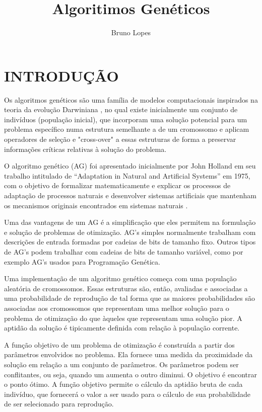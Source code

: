 \documentclass[conference]{IEEEtran}
\begin{document}
\title{Algoritimos Genéticos}

\author{Bruno Lopes}
\maketitle

\section{INTRODUÇÃO}
Os algoritmos genéticos \cite{b1} são uma família de modelos computacionais inspirados na teoria da evolução Darwiniana \cite{b2}, no qual existe inicialmente um conjunto de indivíduos (população inicial), que incorporam uma solução potencial para um problema específico numa estrutura semelhante a de um cromossomo e aplicam operadores de seleção e "cross-over" a essas estruturas de forma a preservar informações críticas relativas à solução do problema.
    
O algoritmo genético (AG) foi apresentado inicialmente por John Holland em seu trabalho intitulado de “Adaptation in Natural and Artificial Systems” em 1975, com o objetivo de  formalizar  matematicamente  e  explicar  os  processos  de  adaptação  de  processos  naturais e  desenvolver  sistemas  artificiais  que  mantenham  os  mecanismos  originais  encontrados  em sistemas naturais \cite{b3}. 

Uma das vantagens de um AG é a simplificação que eles permitem na formulação e solução de  problemas de otimização. AG's simples normalmente trabalham com descrições de entrada formadas por cadeias de bits de tamanho fixo. Outros tipos de AG's podem trabalhar com cadeias de bits de tamanho variável, como por exemplo AG's usados para Programação Genética. 

Uma implementação de um algoritmo genético começa com uma população aleatória de cromossomos. Essas estruturas são, então, avaliadas e associadas a uma probabilidade de reprodução de tal forma que as maiores probabilidades são associadas aos  cromossomos que representam uma melhor solução para o problema de otimização do que àqueles que representam uma solução pior. A aptidão da solução é tipicamente definida com relação à população corrente.

A função objetivo de um problema de otimização é construída a partir dos parâmetros envolvidos no problema. Ela fornece uma medida da proximidade da solução em relação a um conjunto de parâmetros. Os parâmetros podem ser conflitantes, ou seja, quando um aumenta o outro diminui. O objetivo é encontrar o ponto ótimo. A função objetivo permite o cálculo da aptidão bruta de cada indivíduo, que fornecerá o valor a ser  usado para o cálculo de sua probabilidade de ser selecionado para reprodução.
\end{document}
